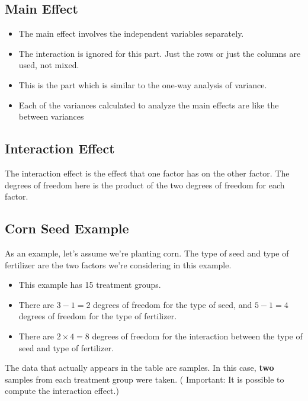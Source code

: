 \documentclass[12pt]{article}
\begin{document}
		\subsection*{Main Effect}
		
		\begin{itemize}
			\item The main effect involves the independent variables separately. 
			\item The interaction is ignored for this part. Just the rows or just the columns are used, not mixed. 
			\item This is the part which is similar to the one-way analysis of variance. 
			\item Each of the variances calculated to analyze the main effects are like the between variances
		\end{itemize}
		
		\subsection*{Interaction Effect}
		
		The interaction effect is the effect that one factor has on the other factor. The degrees of freedom here is the product of the two degrees of freedom for each factor.
		

		


\newpage	
	\subsection*{Corn Seed Example}
	As an example, let's assume we're planting corn. The type of seed and type of fertilizer are the two factors we're considering in this example. 
	
	\begin{itemize}
		\item This example has 15 treatment groups. \item There are $3-1=2$ degrees of freedom for the type of seed, and $5-1=4$ degrees of freedom for the type of fertilizer. 
		\item There are $2\times 4 = 8$ degrees of freedom for the interaction between the type of seed and type of fertilizer.
	\end{itemize}
\noindent The data that actually appears in the table are samples. In this case, \textbf{two} samples from each treatment group were taken. ( Important: It is possible to compute the interaction effect.)
	
\end{document}
